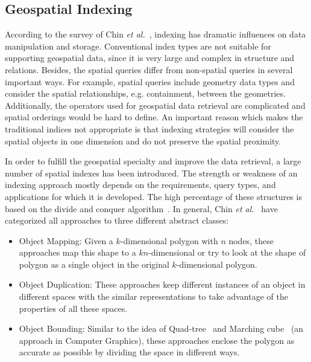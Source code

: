 \documentclass[a4paper,12pt]{article}
\begin{document}

\subsection{Geospatial Indexing}
\label{s.geospatial-index}
According to the survey of Chin \emph{et al.}~\cite{survey}, indexing has dramatic influences on data manipulation and storage. Conventional index types are not suitable for supporting geospatial data, since it is very large and complex in structure and relations. Besides, the spatial queries differ from non-spatial queries in several important ways. For example, spatial queries include geometry data types and consider the spatial relationships, e.g. containment, between the geometries. Additionally, the operators used for geospatial data retrieval are complicated and spatial orderings would be hard to define. An important reason which makes the traditional indices not appropriate is that indexing strategies will consider the spatial objects in one dimension and do not preserve the spatial proximity.

In order to fulfill the geospatial specialty and improve the data retrieval, a large number of spatial indexes has been introduced. The strength or weakness of an indexing approach mostly depends on the requirements, query types, and applications for which it is developed. 
The high percentage of these structures is based on the divide and conquer algorithm~\cite{divconquer}. 
In general, Chin \emph{et al.}~\cite{survey} have categorized all approaches to three different abstract classes:
\begin{itemize}
\item Object Mapping: Given a $k$-dimensional polygon with $n$ nodes, these approaches map this shape to a $kn$-dimensional or try to look at the shape of polygon as a single object in the original $k$-dimensional polygon.   
\item Object Duplication: These approaches keep different instances of an object in different spaces with the similar representations to take advantage of the properties of all these spaces. 
\item Object Bounding: Similar to the idea of Quad-tree~\cite{quadtree} and Marching cube~\cite{marchingcube} (an approach in Computer Graphics), 
these approaches enclose the polygon as accurate as possible by dividing the space in different ways. 
\end{itemize}
\end{document}
